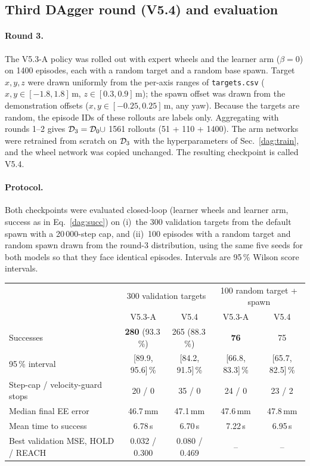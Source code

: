 \subsection{Third DAgger round (V5.4) and evaluation}
\label{dag:v54}

\paragraph{Round 3.} The V5.3-A policy was rolled out with expert wheels and the learner arm ($\beta=0$) on 1400 episodes, each with a random target and a random base spawn. Target $x,y,z$ were drawn uniformly from the per-axis ranges of \texttt{targets.csv} ($x,y\in[-1.8,1.8]$\,m, $z\in[0.3,0.9]$\,m); the spawn offset was drawn from the demonstration offsets ($x,y\in[-0.25,0.25]$\,m, any yaw). Because the targets are random, the episode IDs of these rollouts are labels only. Aggregating with rounds 1--2 gives $\mathcal{D}_3=\mathcal{D}_0\cup$ 1561 rollouts (51 + 110 + 1400). The arm networks were retrained from scratch on $\mathcal{D}_3$ with the hyperparameters of Sec.~\ref{dag:train}, and the wheel network was copied unchanged. The resulting checkpoint is called V5.4.

\paragraph{Protocol.} Both checkpoints were evaluated closed-loop (learner wheels and learner arm, success as in Eq.~\eqref{dag:succ}) on (i)~the 300 validation targets from the default spawn with a 20\,000-step cap, and (ii)~100 episodes with a random target and random spawn drawn from the round-3 distribution, using the same five seeds for both models so that they face identical episodes. Intervals are 95\,\% Wilson score intervals.

\begin{center}
\small
\renewcommand{\arraystretch}{1.12}
\begin{tabular}{@{}lcccc@{}}
\toprule
 & \multicolumn{2}{c}{300 validation targets} & \multicolumn{2}{c}{100 random target + spawn}\\
 & V5.3-A & V5.4 & V5.3-A & V5.4\\
\midrule
Successes & \textbf{280} (93.3\,\%) & 265 (88.3\,\%) & \textbf{76} & 75\\
95\,\% interval & [89.9, 95.6]\,\% & [84.2, 91.5]\,\% & [66.8, 83.3]\,\% & [65.7, 82.5]\,\%\\
Step-cap / velocity-guard stops & 20 / 0 & 35 / 0 & 24 / 0 & 23 / 2\\
Median final EE error & 46.7\,mm & 47.1\,mm & 47.6\,mm & 47.8\,mm\\
Mean time to success & 6.78\,s & 6.70\,s & 7.22\,s & 6.95\,s\\
Best validation MSE, HOLD / REACH & 0.032 / 0.300 & 0.080 / 0.469 & -- & --\\
\bottomrule
\end{tabular}
\end{center}

